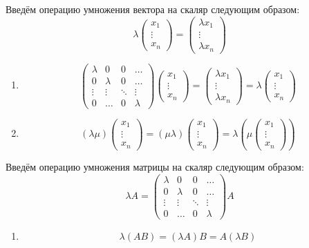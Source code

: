  Введём операцию умножения вектора на скаляр следующим образом:
$$ \lambda
\begin{pmatrix}
    x_1\\
    \vdots\\
    x_n
\end{pmatrix} =
\begin{pmatrix}
    \lambda x_1\\
    \vdots\\
    \lambda x_n
\end{pmatrix} $$
\begin{properties}\leavevmode
    \newcommand\xvec{
        \begin{pmatrix}
            x_1\\
            \vdots\\
            x_n
        \end{pmatrix}
    }
    \begin{enumerate}
        \item
            $$
            \begin{pmatrix}
                \lambda & 0 & 0 & \dots\\
                0 & \lambda & 0 & \dots\\
                \vdots & \vdots & \ddots & \vdots\\
                0 & \dots & 0 & \lambda
            \end{pmatrix}
            \xvec
            =
            \begin{pmatrix}
                \lambda x_1\\
                \vdots\\
                \lambda x_n
            \end{pmatrix} = 
            \lambda
            \xvec
            $$
        \item
            $$
            (\lambda\mu)\xvec = (\mu\lambda)\xvec = \lambda\left(\mu\xvec\right)
            $$
    \end{enumerate}
\end{properties}
 Введём операцию умножения матрицы на скаляр следующим образом:
$$ \lambda A = 
\begin{pmatrix}
    \lambda & 0 & 0 & \dots\\
    0 & \lambda & 0 & \dots\\
    \vdots & \vdots & \ddots & \vdots\\
    0 & \dots & 0 & \lambda
\end{pmatrix} A $$
\begin{properties}\leavevmode
    \begin{enumerate}
        \item
            $$
            \lambda(AB) = (\lambda A)B = A(\lambda B)
            $$
    \end{enumerate}
\end{properties}
